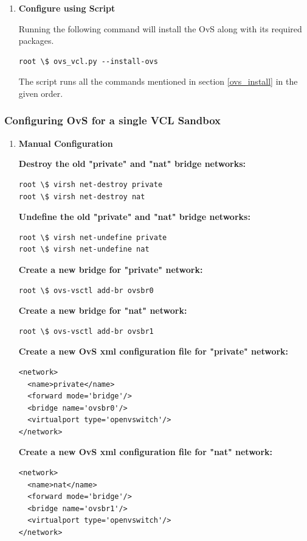\documentclass[12pt]{extarticle}
\begin{document}
\begin{enumerate}
\item \textbf{Configure using Script}

Running the following command will install the OvS along with its required packages.
\begin{verbatim}
root \$ ovs_vcl.py --install-ovs   
\end{verbatim}
\noindent
The script runs all the commands mentioned in section \ref{ovs_install} in the given order.
\end{enumerate}


\subsubsection{Configuring OvS for a single VCL Sandbox} \label{ovs_one_sandbox}

\begin{enumerate}
\item \textbf{Manual Configuration}

\noindent
\textbf{Destroy the old "private" and "nat" bridge networks:}
\begin{verbatim}
root \$ virsh net-destroy private
root \$ virsh net-destroy nat
\end{verbatim}

\noindent
\textbf{Undefine the old "private" and "nat" bridge networks:}
\begin{verbatim}
root \$ virsh net-undefine private
root \$ virsh net-undefine nat
\end{verbatim}

\noindent
\textbf{Create a new bridge for "private" network:}
\begin{verbatim}
root \$ ovs-vsctl add-br ovsbr0
\end{verbatim}

\noindent
\textbf{Create a new bridge for "nat" network:}
\begin{verbatim}
root \$ ovs-vsctl add-br ovsbr1
\end{verbatim}


\noindent
\textbf{Create a new OvS xml configuration file for "private" network:}
\begin{verbatim}
<network>
  <name>private</name>
  <forward mode='bridge'/>
  <bridge name='ovsbr0'/>
  <virtualport type='openvswitch'/>
</network>
\end{verbatim}

\noindent
\textbf{Create a new OvS xml configuration file for "nat" network:}
\begin{verbatim}
<network>
  <name>nat</name>
  <forward mode='bridge'/>
  <bridge name='ovsbr1'/>
  <virtualport type='openvswitch'/>
</network>
\end{verbatim}


\end{enumerate}
\end{document}
